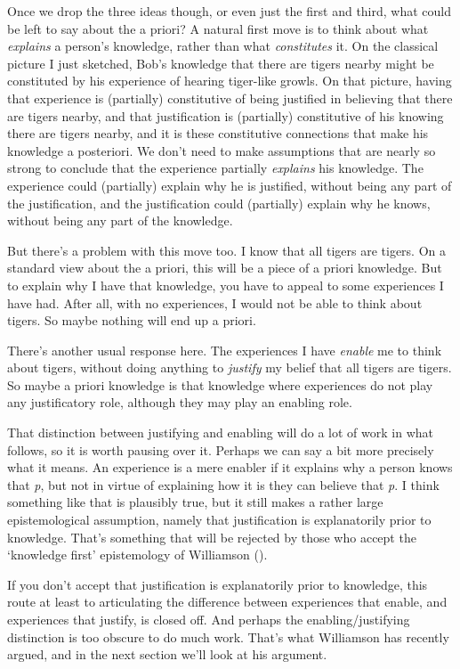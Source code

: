 \documentclass[
  10pt,
  letterpaper,
  DIV=11,
  numbers=noendperiod,
  twoside]{scrartcl}
\begin{document}
Once we drop the three ideas though, or even just the first and third,
what could be left to say about the a priori? A natural first move is to
think about what \emph{explains} a person's knowledge, rather than what
\emph{constitutes} it. On the classical picture I just sketched, Bob's
knowledge that there are tigers nearby might be constituted by his
experience of hearing tiger-like growls. On that picture, having that
experience is (partially) constitutive of being justified in believing
that there are tigers nearby, and that justification is (partially)
constitutive of his knowing there are tigers nearby, and it is these
constitutive connections that make his knowledge a posteriori. We don't
need to make assumptions that are nearly so strong to conclude that the
experience partially \emph{explains} his knowledge. The experience could
(partially) explain why he is justified, without being any part of the
justification, and the justification could (partially) explain why he
knows, without being any part of the knowledge.

But there's a problem with this move too. I know that all tigers are
tigers. On a standard view about the a priori, this will be a piece of a
priori knowledge. But to explain why I have that knowledge, you have to
appeal to some experiences I have had. After all, with no experiences, I
would not be able to think about tigers. So maybe nothing will end up a
priori.

There's another usual response here. The experiences I have
\emph{enable} me to think about tigers, without doing anything to
\emph{justify} my belief that all tigers are tigers. So maybe a priori
knowledge is that knowledge where experiences do not play any
justificatory role, although they may play an enabling role.

That distinction between justifying and enabling will do a lot of work
in what follows, so it is worth pausing over it. Perhaps we can say a
bit more precisely what it means. An experience is a mere enabler if it
explains why a person knows that \emph{p}, but not in virtue of
explaining how it is they can believe that \emph{p}. I think something
like that is plausibly true, but it still makes a rather large
epistemological assumption, namely that justification is explanatorily
prior to knowledge. That's something that will be rejected by those who
accept the `knowledge first' epistemology of Williamson
().

If you don't accept that justification is explanatorily prior to
knowledge, this route at least to articulating the difference between
experiences that enable, and experiences that justify, is closed off.
And perhaps the enabling/justifying distinction is too obscure to do
much work. That's what Williamson has recently argued, and in the next
section we'll look at his argument.
\end{document}
